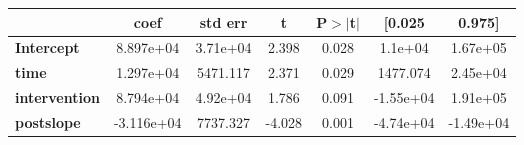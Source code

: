 \begin{center}
\begin{tabular}{lcccccc}
\toprule
                      & \textbf{coef} & \textbf{std err} & \textbf{t} & \textbf{P$> |$t$|$} & \textbf{[0.025} & \textbf{0.975]}  \\
\midrule
\textbf{Intercept}    &    8.897e+04  &     3.71e+04     &     2.398  &         0.028        &      1.1e+04    &     1.67e+05     \\
\textbf{time}         &    1.297e+04  &     5471.117     &     2.371  &         0.029        &     1477.074    &     2.45e+04     \\
\textbf{intervention} &    8.794e+04  &     4.92e+04     &     1.786  &         0.091        &    -1.55e+04    &     1.91e+05     \\
\textbf{postslope}    &   -3.116e+04  &     7737.327     &    -4.028  &         0.001        &    -4.74e+04    &    -1.49e+04     \\
\bottomrule
\end{tabular}
\end{center}